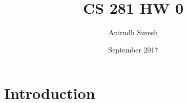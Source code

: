 \documentclass{article}
\title{CS 281 HW 0}
\author{Anirudh Suresh}
\date{September 2017}
\begin{document}
\maketitle

\section{Introduction}
\end{document}
